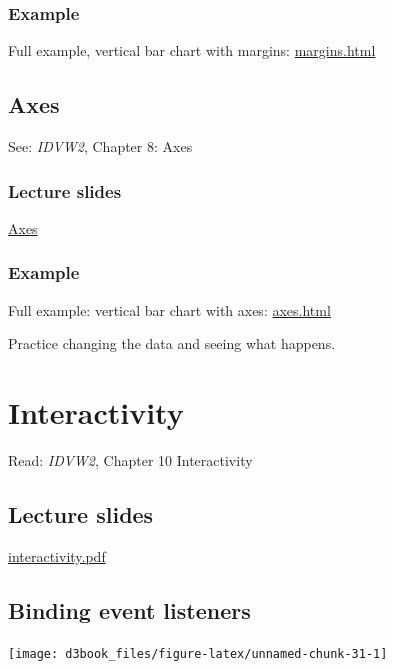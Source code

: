 \documentclass[openany]{book}
\begin{document}
\hypertarget{example}{%
\subsection{Example}\label{example}}

Full example, vertical bar chart with margins: \href{code/margins.html}{margins.html}

\hypertarget{axes}{%
\section{Axes}\label{axes}}

See: \emph{IDVW2}, Chapter 8: Axes

\hypertarget{lecture-slides-3}{%
\subsection{Lecture slides }\label{lecture-slides-3}}

\href{pdfs/axes.pdf}{Axes}

\hypertarget{example-1}{%
\subsection{Example}\label{example-1}}

Full example: vertical bar chart with axes: \href{code/axes.html}{axes.html}

Practice changing the data and seeing what happens.

\hypertarget{interactivity}{%
\chapter{Interactivity }\label{interactivity}}

Read: \emph{IDVW2}, Chapter 10 Interactivity

\hypertarget{lecture-slides-4}{%
\section{Lecture slides }\label{lecture-slides-4}}

\href{pdfs/interactivity.pdf}{interactivity.pdf}

\hypertarget{binding-event-listeners}{%
\section{Binding event listeners}\label{binding-event-listeners}}

\texttt{[image: d3book\_files/figure-latex/unnamed-chunk-31-1]}
\end{document}
